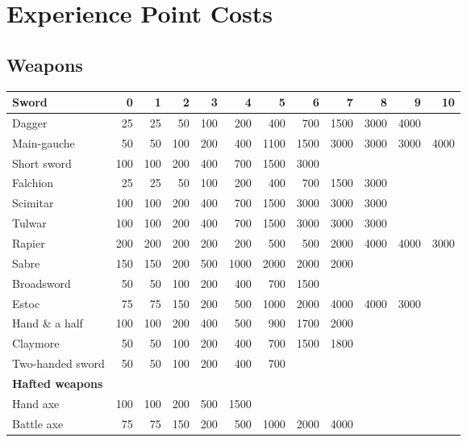 \section{Experience Point Costs}
\label{tables:ep}

\subsection{Weapons}

{\newcommand{\tb}{\textbf}
{ \begin{tabularx}{\linewidth}{Xrrrrrrrrrrr} \hline
\tb{Sword}	&\tb{0}	&\tb{1}	&\tb{2}	&\tb{3}	&\tb{4} &\tb{5}	&\tb{6}	&\tb{7}	&\tb{8}	&\tb{9}	&\tb{10} \\ \hline
Dagger		& 25	& 25	& 50	& 100	& 200	& 400	& 700	& 1500	& 3000	& 4000	&	 \\ \hline
Main-gauche	& 50	& 50	& 100	& 200	& 400	& 1100	& 1500	& 3000	& 3000	& 3000	& 4000	 \\ \hline
Short sword	& 100	& 100	& 200	& 400	& 700	& 1500	& 3000	&	&	&	&	 \\ \hline
Falchion	& 25	& 25	& 50	& 100	& 200	& 400	& 700	& 1500	& 3000	&	&	 \\ \hline
Scimitar	& 100	& 100	& 200	& 400	& 700	& 1500	& 3000	& 3000	& 3000	&	&	 \\ \hline
Tulwar		& 100	& 100	& 200	& 400	& 700	& 1500	& 3000	& 3000	& 3000 	&	&	 \\ \hline
Rapier		& 200	& 200	& 200	& 200	& 200	& 500	& 500	& 2000	& 4000	& 4000	& 3000	 \\ \hline
Sabre		& 150	& 150	& 200	& 500	& 1000	& 2000	& 2000	& 2000	&	&	&	 \\ \hline
Broadsword	& 50	& 50	& 100	& 200	& 400	& 700	& 1500	&	&	&	&	 \\ \hline
Estoc		& 75	& 75	& 150	& 200	& 500	& 1000	& 2000	& 4000	& 4000	& 3000	&	 \\ \hline
Hand \& a half	& 100	& 100	& 200	& 400	& 500	& 900	& 1700	& 2000	&	&	&	 \\ \hline
Claymore	& 50	& 50	& 100	& 200	& 400	& 700	& 1500	& 1800	&	&	&	 \\ \hline
Two-handed sword& 50	& 50	& 100	& 200	& 400	& 700	&	&	&	&	&	 \\ \hline
\tb{Hafted weapons}&&	&	&	&	&	&	&	&	&	&	 \\ \hline
Hand axe	& 100	& 100	& 200	& 500	& 1500	&	&	&	&	&	&	 \\ \hline
Battle axe	& 75	& 75	& 150	& 200	& 500	& 1000	& 2000	& 4000	&	&	&	 \\ \hline

\end{tabularx}}}
